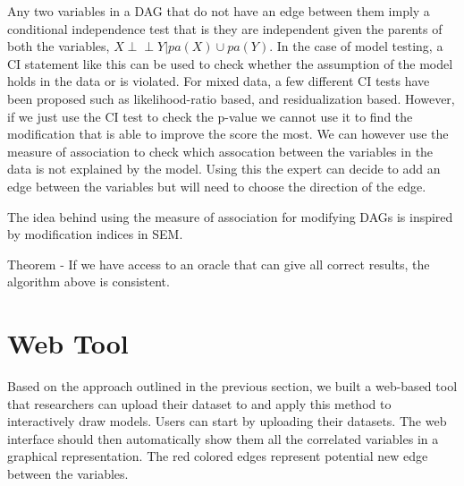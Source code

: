 \documentclass[letterpaper]{article} %
\def\ci{\perp\!\!\!\!\!\perp}
\begin{document}
Any two variables in a DAG that do not have an edge between them imply a
conditional independence test that is they are independent given the parents of
both the variables, $ X \ci Y | pa(X) \cup pa(Y) $. In the case of model
testing, a CI statement like this can be used to check whether the assumption
of the model holds in the data or is violated. For mixed data, a few different
CI tests have been proposed such as likelihood-ratio based, and residualization
based. However, if we just use the CI test to check the p-value we cannot use
it to find the modification that is able to improve the score the most. We can
however use the measure of association to check which assocation between the
variables in the data is not explained by the model. Using this the expert can
decide to add an edge between the variables but will need to choose the
direction of the edge.

The idea behind using the measure of association for modifying DAGs is inspired
by modification indices in SEM. 

Theorem - If we have access to an oracle that can give all correct results, 
the algorithm above is consistent.

\section{Web Tool}
\label{sec:web}
Based on the approach outlined in the previous section, we built a web-based
tool that researchers can upload their dataset to and apply this method to
interactively draw models. Users can start by uploading their datasets. The web
interface should then automatically show them all the correlated variables in a
graphical representation. The red colored edges represent potential new edge
between the variables.


\end{document}
